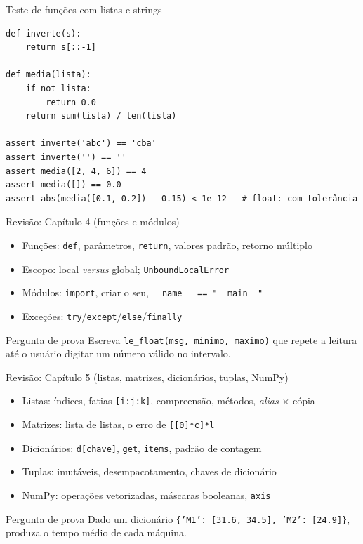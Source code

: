 \documentclass[aspectratio=169,10pt,t]{beamer}
\begin{document}
\begin{frame}[fragile]{Teste de funções com listas e strings}
\begin{lstlisting}
def inverte(s):
    return s[::-1]

def media(lista):
    if not lista:
        return 0.0
    return sum(lista) / len(lista)

assert inverte('abc') == 'cba'
assert inverte('') == ''
assert media([2, 4, 6]) == 4
assert media([]) == 0.0
assert abs(media([0.1, 0.2]) - 0.15) < 1e-12   # float: com tolerância
\end{lstlisting}
\end{frame}

\begin{frame}{Revisão: Capítulo 4 (funções e módulos)}
  \begin{itemize}
    \item Funções: \texttt{def}, parâmetros, \texttt{return}, valores padrão, retorno múltiplo
    \item Escopo: local \emph{versus} global; \texttt{UnboundLocalError}
    \item Módulos: \texttt{import}, criar o seu, \texttt{\_\_name\_\_ == "\_\_main\_\_"}
    \item Exceções: \texttt{try}/\texttt{except}/\texttt{else}/\texttt{finally}
  \end{itemize}
  \begin{exampleblock}{Pergunta de prova}
    Escreva \texttt{le\_float(msg, minimo, maximo)} que repete a leitura até o usuário digitar um número válido no intervalo.
  \end{exampleblock}
\end{frame}

\begin{frame}{Revisão: Capítulo 5 (listas, matrizes, dicionários, tuplas, NumPy)}
  \begin{itemize}
    \item Listas: índices, fatias \texttt{[i:j:k]}, compreensão, métodos, \emph{alias} \(\times\) cópia
    \item Matrizes: lista de listas, o erro de \texttt{[[0]*c]*l}
    \item Dicionários: \texttt{d[chave]}, \texttt{get}, \texttt{items}, padrão de contagem
    \item Tuplas: imutáveis, desempacotamento, chaves de dicionário
    \item NumPy: operações vetorizadas, máscaras booleanas, \texttt{axis}
  \end{itemize}
  \begin{exampleblock}{Pergunta de prova}
    Dado um dicionário \texttt{\{'M1': [31.6, 34.5], 'M2': [24.9]\}}, produza o tempo médio de cada máquina.
  \end{exampleblock}
\end{frame}
\end{document}
